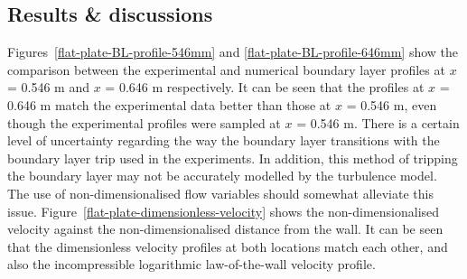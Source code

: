 \subsection{Results \& discussions}
\label{flat-plate-results-and-discussions}
%
Figures~\ref{flat-plate-BL-profile-546mm} and \ref{flat-plate-BL-profile-646mm} 
show the comparison between the experimental and numerical boundary layer 
profiles at $x$ = 0.546 m and $x$ = 0.646 m respectively. It can be seen that 
the profiles at $x$ = 0.646 m match the experimental data better than those at 
$x$ = 0.546 m, even though the experimental profiles were sampled at $x$ = 0.546 m.
There is a certain level of uncertainty regarding the way the boundary layer transitions with
the boundary layer trip used in the experiments. In addition, this method of tripping the
boundary layer may not be accurately modelled by the turbulence model. The use of 
non-dimensionalised flow variables should somewhat alleviate this issue. 
Figure~\ref{flat-plate-dimensionless-velocity} shows the non-dimensionalised 
velocity against the non-dimensionalised distance from the wall. It can be
seen that the dimensionless velocity profiles at both locations match each other, and also the
incompressible logarithmic law-of-the-wall velocity profile.
%
